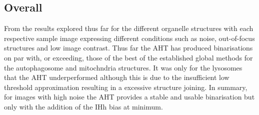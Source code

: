 \subsection{Overall}
From the results explored thus far for the different organelle structures with each respective sample image expressing different conditions such as noise, out-of-focus structures and low image contrast. Thus far the AHT has produced binarisations on par with, or exceeding, those of the best of the established global methods for the autophagosome and mitochndria structures. It was only for the lysosomes that the AHT underperformed although this is due to the insufficient low threshold approximation resulting in a excessive structure joining. In summary, for images with high noise the AHT provides a stable and usable binarisation but only with the addition of the IHh bias at minimum.

